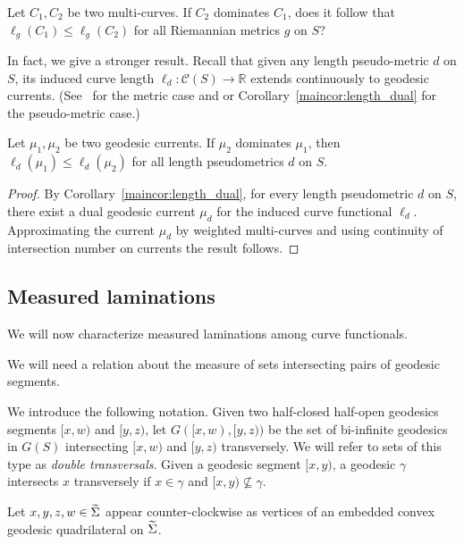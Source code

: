 \begin{question}
Let $C_1,C_2$ be two multi-curves. If $C_2$ dominates $C_1$, does it follow that $\ell_g(C_1) \leq \ell_g(C_2)$ for all Riemannian metrics $g$ on $S$?
\end{question}

In fact, we give a stronger result.
Recall that given any length pseudo-metric $d$ on $S$, its
induced curve length $\ell_d \colon \mathcal{C}(S) \to \mathbb{R}$
extends continuously to geodesic currents.
(See~\cite[Theorem~1.5]{EPS20:CountingCurves} for the metric case
and \cite[Corollary~6.13]{CMGR26:GreenMetrics} or
Corollary~\ref{maincor:length_dual} for the pseudo-metric case.)
\begin{corollary}\label{cor:domination}
Let $\mu_1, \mu_2$ be two geodesic currents. If $\mu_2$ dominates $\mu_1$, then
    $\ell_d(\mu_1) \leq \ell_d(\mu_2)$ for all length pseudometrics $d$ on $S$.
\end{corollary}

\begin{proof}
By Corollary~\ref{maincor:length_dual}, for every length pseudometric $d$ on $S$, there exist a dual geodesic current $\mu_d$ for the induced curve functional $\ell_d$.
Approximating the current $\mu_d$ by weighted multi-curves and using continuity of intersection number on currents the result follows.
\end{proof}


\subsection{Measured laminations}
\label{subsec:laminations}

We will now characterize measured laminations among curve functionals.

We will need a relation about the measure of sets intersecting pairs of geodesic segments.

We introduce the following notation. Given two half-closed half-open
geodesics segments $[x,w)$ and $[y,z)$, let $G([x,w), [y,z))$ be the set of bi-infinite geodesics in $G(S)$ intersecting $[x,w)$ and $[y,z)$ transversely. We will refer to sets of this type as \emph{double transversals}. Given a geodesic segment $[x,y)$, a geodesic $\gamma$ intersects $x$ transversely if $x\in\gamma$ and $[x,y) \nsubseteq \gamma$.

Let $x,y,z,w \in \widetilde{\Sigma}$ appear counter-clockwise as vertices of an
embedded convex geodesic quadrilateral on $\widetilde{\Sigma}$.

